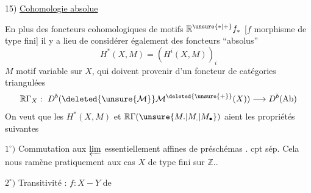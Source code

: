 15) \uline{Cohomologie absolue}

En plus des foncteurs cohomologiques de motifs $\mathbb R^{\unsure{*|+}}f_*$ [$f$ morphisme de type fini] il y a lieu de considérer également des foncteurs ``absolus''
\[
H^*(X,M)=(H^i(X,M))_i
\]
$M$ motif variable sur $X$, qui doivent provenir d'un foncteur de catégories triangulées
\[
\mathbb R\Gamma_X:\ D^b(\deleted{\unsure{\mathcal M}}\mathcal M^{\deleted{\unsure{+}}}(X))\longrightarrow D^b(\mathrm{Ab})
\]
On veut que les $H^*(X,M)$ et $\mathbb R\Gamma(\unsure{M.|M_.|M_{\bullet}})$ aient les propriétés suivantes

$1^\circ)$ Commutation aux $\varprojlim$ essentiellement affines de préschémas .  cpt  sép. Cela nous ramène pratiquement aux cas $X$ de type fini sur $\mathbb Z$..

$2^\circ)$ Transitivité :  $f:X\mathbin{-}Y$ de

